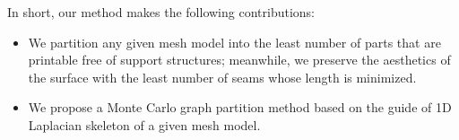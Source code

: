 In short, our method makes the following contributions:

\begin{itemize}
\item {We partition any given mesh model into the least number of parts that are printable free of support structures; meanwhile, we preserve the aesthetics of the surface with the least number of seams whose length is minimized.}
\item {We propose a Monte Carlo graph partition method based on the guide of 1D Laplacian skeleton of a given mesh model.}
\end{itemize}
